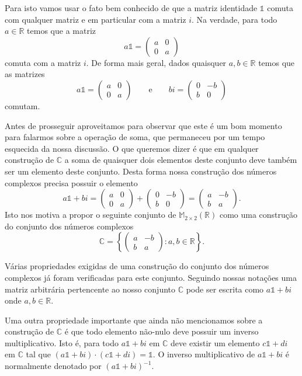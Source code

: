 Para isto vamos usar o fato bem conhecido de que a matriz identidade $\mathds{1}$ comuta com qualquer
matriz e em particular com a matriz $i$. Na verdade, para todo $a\in\mathbb{R}$ 
temos que a matriz 
\[
a\mathds{1} 
= 
\begin{pmatrix}
a&0\\
0&a
\end{pmatrix}
\] 
comuta com a matriz $i$. De forma mais geral, dados quaisquer $a,b\in\mathbb{R}$
temos que as matrizes
\[
a\mathds{1} 
= 
\begin{pmatrix}
a&0\\
0&a
\end{pmatrix}
\qquad \text{e}\qquad 
bi= 
\begin{pmatrix}
0&-b\\
b&0
\end{pmatrix}
\]
comutam. 

Antes de prosseguir aproveitamos para observar que este é um bom momento 
para falarmos sobre a operação de soma, que permaneceu por um tempo 
esquecida da nossa discussão. O que queremos dizer é que em qualquer construção de $\mathbb{C}$
a soma de quaisquer dois elementos deste conjunto deve também ser um elemento deste conjunto. 
Desta forma nossa construção dos números complexos precisa possuir o elemento 
\[
a\mathds{1}+b i = 
\begin{pmatrix}
a&0\\
0&a
\end{pmatrix}
+
\begin{pmatrix}
0&-b\\
b&0
\end{pmatrix}
=
\begin{pmatrix}
a&-b\\
b&a
\end{pmatrix}.
\]
Isto nos motiva a propor o seguinte conjunto de $\mathbb{M}_{2\times 2}(\mathbb{R})$ 
como uma construção do conjunto dos números complexos
\[
\mathbb{C}
= 
\left\{
\begin{pmatrix}
a&-b\\
b&a
\end{pmatrix}
:
a,b\in \mathbb{R}
\right\}.
\] 

Várias propriedades exigidas de uma construção do conjunto dos números complexos já 
foram verificadas para este conjunto. Seguindo nossas notações uma matriz arbitrária 
pertencente ao nosso conjunto $\mathbb{C}$ pode ser escrita 
como $a\mathds{1}+ bi$ onde $a,b\in\mathbb{R}$.

Uma outra propriedade importante que ainda não mencionamos sobre a construção de $\mathbb{C}$
é que todo elemento não-nulo deve possuir um inverso multiplicativo. 
Isto é, para todo $a\mathds{1}+ bi$ em $\mathbb{C}$ deve existir um elemento $c\mathds{1}+ di$ em $\mathbb{C}$
tal que $(a\mathds{1}+ bi)\cdot (c\mathds{1}+ di) = \mathds{1}$. 
O inverso multiplicativo de $a\mathds{1}+ bi$ é normalmente denotado por $(a\mathds{1}+ bi)^{-1}$.

